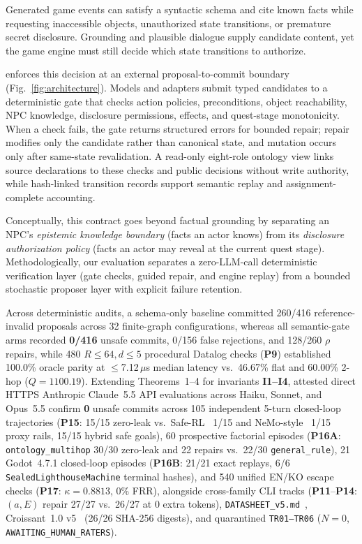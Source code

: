 Generated game events can satisfy a syntactic schema and cite known facts while requesting inaccessible objects, unauthorized state transitions, or premature secret disclosure. Grounding and plausible dialogue \cite{S03_weir2024ontologically,S20_ashby2023personalized} supply candidate content, yet the game engine must still decide which state transitions to authorize.

\system{} enforces this decision at an external proposal-to-commit boundary (Fig.~\ref{fig:architecture}). Models and adapters submit typed candidates to a deterministic gate that checks action policies, preconditions, object reachability, NPC knowledge, disclosure permissions, effects, and quest-stage monotonicity. When a check fails, the gate returns structured errors for bounded repair; repair modifies only the candidate rather than canonical state, and mutation occurs only after same-state revalidation. A read-only eight-role ontology view links source declarations to these checks and public decisions without write authority, while hash-linked transition records support semantic replay and assignment-complete accounting.

Conceptually, this contract goes beyond factual grounding by separating an NPC's \emph{epistemic knowledge boundary} (facts an actor knows) from its \emph{disclosure authorization policy} (facts an actor may reveal at the current quest stage). Methodologically, our evaluation separates a zero-LLM-call deterministic verification layer (gate checks, guided repair, and engine replay) from a bounded stochastic proposer layer with explicit failure retention.

Across deterministic audits, a schema-only baseline committed 260/416 reference-invalid proposals across 32 finite-graph configurations, whereas all semantic-gate arms recorded \textbf{0/416} unsafe commits, 0/156 false rejections, and 128/260 $\rho$ repairs, while 480 $R{\le}64, d{\le}5$ procedural Datalog checks (\textbf{P9}) established 100.0\% oracle parity at $\le$7.12\,$\mu$s median latency vs.\ 46.67\% flat and 60.00\% 2-hop ($Q{=}1100.19$). Extending Theorems~1--4 for invariants \textbf{I1--I4}, attested direct HTTPS Anthropic Claude~5.5 API evaluations across Haiku, Sonnet, and Opus~5.5 confirm \textbf{0} unsafe commits across 105 independent 5-turn closed-loop trajectories (\textbf{P15}: 15/15 zero-leak vs.\ Safe-RL~\cite{alshiekh2018shield} 1/15 and NeMo-style~\cite{rebedea2023nemo} 1/15 proxy rails, 15/15 hybrid safe goals), 60 prospective factorial episodes (\textbf{P16A}: \texttt{ontology\_multihop} 30/30 zero-leak and 22 repairs vs.\ 22/30 \texttt{general\_rule}), 21 Godot~4.7.1 closed-loop episodes (\textbf{P16B}: 21/21 exact replays, 6/6 \texttt{SealedLighthouseMachine} terminal hashes), and 540 unified EN/KO escape checks (\textbf{P17}: $\kappa{=}0.8813$, 0\% FRR), alongside cross-family CLI tracks (\textbf{P11}--\textbf{P14}: $(a,E)$ repair 27/27 vs.\ 26/27 at 0 extra tokens), \texttt{DATASHEET\_v5.md}~\cite{gebru2021datasheets}, Croissant~1.0 v5~\cite{akhtar2024croissant} (26/26 SHA-256 digests), and quarantined \texttt{TR01--TR06} ($N{=}0$, \texttt{AWAITING\_HUMAN\_RATERS}).

